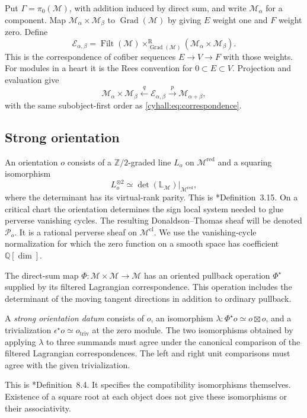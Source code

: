 Put $\Gamma=\pi_0(\mathcal M)$, with addition induced by direct sum,
and write $\mathcal M_\alpha$ for a component.
Map $\mathcal M_\alpha\times\mathcal M_\beta$ to
$\operatorname{Grad}(\mathcal M)$ by giving $E$ weight one and
$F$ weight zero. Define
\[
 \mathcal E_{\alpha,\beta}=
 \operatorname{Filt}(\mathcal M)
 \mathop{\times}^{\mathrm R}_{\operatorname{Grad}(\mathcal M)}
 (\mathcal M_\alpha\times\mathcal M_\beta).
\]
This is the correspondence of cofiber sequences $E\to V\to F$
with those weights. For modules in a heart it is the Rees
convention for $0\subset E\subset V$.
Projection and evaluation give
\[
 \mathcal M_\alpha\times\mathcal M_\beta
 \xleftarrow{\ q\ }\mathcal E_{\alpha,\beta}
 \xrightarrow{\ p\ }\mathcal M_{\alpha+\beta},
\]
with the same subobject-first order as
\eqref{cyhall:eq:correspondence}.

\subsection{Strong orientation}

An orientation $o$ consists of a $\mathbb Z/2$-graded line $L_o$
on $\mathcal M^{\mathrm{red}}$ and a squaring isomorphism
\[
 L_o^{\otimes2}\simeq
 \det(\mathbb L_{\mathcal M})|_{\mathcal M^{\mathrm{red}}},
\]
where the determinant has its virtual-rank parity.
This is \cite{cyhall:KPS}*{Definition~3.15}.
On a critical chart the orientation determines the
sign local system needed to glue perverse vanishing cycles.
The resulting Donaldson--Thomas sheaf will be denoted $\mathcal P_o$.
It is a rational perverse sheaf on $\mathcal M^{\mathrm{cl}}$.
We use the vanishing-cycle normalization for which the zero
function on a smooth space has coefficient $\mathbb Q[\dim]$.

The direct-sum map $\Phi:\mathcal M\times\mathcal M\to\mathcal M$
has an oriented pullback operation $\Phi^\star$ supplied by its
filtered Lagrangian correspondence. This operation includes the
determinant of the moving tangent directions in addition to
ordinary pullback.
\begin{definition}\label{cyhall:def:strong-orientation}
A \emph{strong orientation datum} consists of $o$, an isomorphism
$\lambda:\Phi^\star o\simeq o\boxtimes o$, and a trivialization
$\epsilon^\star o\simeq o_{\mathrm{triv}}$ at the zero module.
The two isomorphisms obtained by applying $\lambda$ to three
summands must agree under the canonical comparison of the
filtered Lagrangian correspondences. The left and right unit
comparisons must agree with the given trivialization.
\end{definition}
This is \cite{cyhall:KPS}*{Definition~8.4}.
It specifies the compatibility isomorphisms themselves.
Existence of a square root at each object does not give these
isomorphisms or their associativity.

